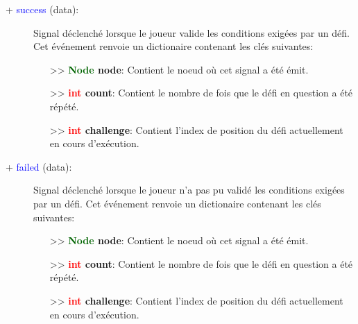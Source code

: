 \documentclass[a4paper, 11pt]{article}
\begin{document}
	\begin{description}
		\item [+ \textcolor{blue}{success} (data):] Signal déclenché lorsque le joueur valide les conditions 
		exigées par un défi. Cet événement renvoie un dictionaire contenant les clés suivantes:
		\begin{itemize}
			\item [>> \textbf{\textcolor{darkgreen}{Node} node}:] Contient le noeud où cet signal a été 
			émit.
			\item [>> \textbf{\textcolor{red}{int} count}:] Contient le nombre de fois que le défi en 
			question a été répété.
			\item [>> \textbf{\textcolor{red}{int} challenge}:] Contient l'index de position du défi 
			actuellement en cours d'exécution.\\
		\end{itemize}
	\end{description}
	\begin{description}
		\item [+ \textcolor{blue}{failed} (data):] Signal déclenché lorsque le joueur n'a pas pu validé les 
		conditions exigées par un défi. Cet événement renvoie un dictionaire contenant les clés suivantes:
		\begin{itemize}
			\item [>> \textbf{\textcolor{darkgreen}{Node} node}:] Contient le noeud où cet signal a été 
			émit.
			\item [>> \textbf{\textcolor{red}{int} count}:] Contient le nombre de fois que le défi en 
			question a été répété.
			\item [>> \textbf{\textcolor{red}{int} challenge}:] Contient l'index de position du défi 
			actuellement en cours d'exécution.\\
		\end{itemize}
	\end{description}
\end{document}
